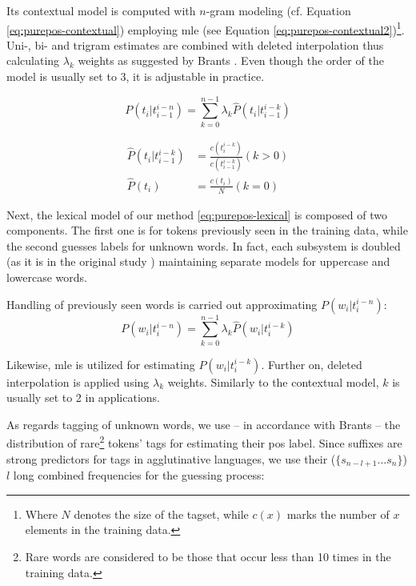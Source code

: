 Its contextual model is computed with $n$-gram modeling (cf. Equation \ref{eq:purepos-contextual}) employing \gls{mle} (see Equation \ref{eq:purepos-contextual2})\footnote{Where $N$ denotes the size of the tagset, while $c(x)$ marks the number of $x$ elements in the training data.}. Uni-, bi- and trigram estimates are combined with deleted interpolation thus calculating $\lambda_k$ weights as suggested by Brants \cite{Brants2000}. Even though the order of the model is usually set to 3, it is adjustable in practice. 


\begin{equation}\label{eq:purepos-contextual}
P(t_i | t_{i-1}^{i-n}) = \sum_{k=0}^{n-1} \lambda_k \hat{P}(t_i|t_{i-1}^{i-k})
\end{equation}

\begin{align}\label{eq:purepos-contextual2}
\hat{P}(t_i|t_{i-1}^{i-k}) & = \frac{c(t^{i-k}_i)}{c(t_{i-1}^{i-k})} (k>0) \\
\hat{P}(t_i) & = \frac{c(t_i)}{N} (k=0)
\end{align}

Next, the lexical model of our method \eqref{eq:purepos-lexical} is composed of two components. 
The first one is for tokens previously seen in the training data, while the second guesses labels for unknown words. 
In fact, each subsystem is doubled (as it is in the original study \cite{Brants2000}) maintaining separate models for uppercase and lowercase words. 

Handling of previously seen words is carried out approximating $P(w_i | t_{i}^{i-n})$: 
\begin{equation} \label{eq:purepos-lexical}
P(w_i | t_{i}^{i-n}) = \sum_{k=0}^{n-1} \lambda_k \hat{P}(w_i|t_{i}^{i-k})
\end{equation}

\label{sec:purepos-guesser}
Likewise, \gls{mle} is utilized for estimating $P(w_i|t_{i}^{i-k})$. 
Further on, deleted interpolation is applied using $\lambda_k$ weights. 
Similarly to the contextual model, $k$ is usually set to 2 in applications.

As regards tagging of unknown words, we use -- in accordance with Brants -- the distribution of rare\footnote{Rare words are considered to be those that occur less than 10 times in the training data.}
 tokens’ tags for estimating their \gls{pos} label. Since suffixes are strong predictors for tags in agglutinative languages, we use their ($\{s_{n-l+1} \dots s_n\}$) $l$ long combined frequencies for the guessing process:

